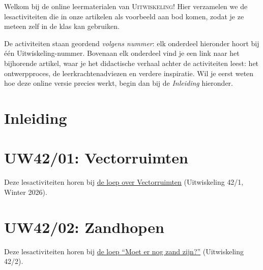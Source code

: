 \documentclass[10pt,numbers,noauthor,nooutcomes,wordchoicegiven]{xourse}
\begin{document}

\providecommand{\rubriek}[2]{}    %

\rubriek{loep}{Onder de loep}
\pagestyle{uitwiskeling}

Welkom bij de online leermaterialen van \textsc{Uitwiskeling}!
Hier verzamelen we de lesactiviteiten die in onze artikelen als voorbeeld aan bod komen, zodat je ze meteen zelf in de klas kan gebruiken.

De activiteiten staan geordend \emph{volgens nummer}: elk onderdeel hieronder hoort bij één Uitwiskeling-nummer.
Bovenaan elk onderdeel vind je een link naar het bijhorende artikel, waar je het didactische verhaal achter de activiteiten leest: het ontwerpproces, de leerkrachtenadviezen en verdere inspiratie.
Wil je eerst weten hoe deze online versie precies werkt, begin dan bij de \emph{Inleiding} hieronder.

\part{Inleiding}



\part{UW42/01: Vectorruimten}
Deze lesactiviteiten horen bij \href{https://www.uitwiskeling.be/2026/02/16/vectorruimten-2/}{de loep over Vectorruimten} (Uitwiskeling 42/1, Winter 2026).

\part{UW42/02: Zandhopen}
Deze lesactiviteiten horen bij \href{https://www.uitwiskeling.be/2026/04/16/zandhopen/}{de loep ``Moet er nog zand zijn?''} (Uitwiskeling 42/2).
\end{document}
